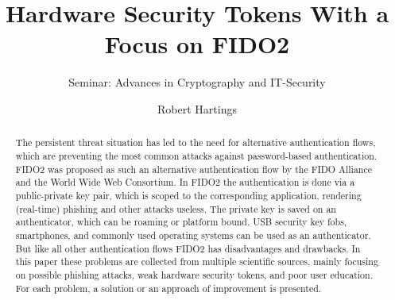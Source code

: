 \documentclass[runningheads]{llncs}
\begin{document}
%
\title{Hardware Security Tokens With a Focus on FIDO2}
\subtitle{Seminar: Advances in Cryptography and IT-Security}
%
%

\author{Robert Hartings}

%
\maketitle              %
\begin{abstract}
The persistent threat situation has led to the need for alternative authentication flows, which are preventing the most common attacks against password-based authentication. FIDO2 was proposed as such an alternative authentication flow by the FIDO Alliance and the World Wide Web Consortium. In FIDO2 the authentication is done via a public-private key pair, which is scoped to the corresponding application, rendering (real-time) phishing and other attacks useless. The private key is saved on an authenticator, which can be roaming or platform bound. USB security key fobs, smartphones, and commonly used operating systems can be used as an authenticator. But like all other authentication flows FIDO2 has disadvantages and drawbacks. In this paper these problems are collected from multiple scientific sources, mainly focusing on possible phishing attacks, weak hardware security tokens, and poor user education. For each problem, a solution or an approach of improvement is presented.

\end{abstract}
%
%
%
\end{document}
